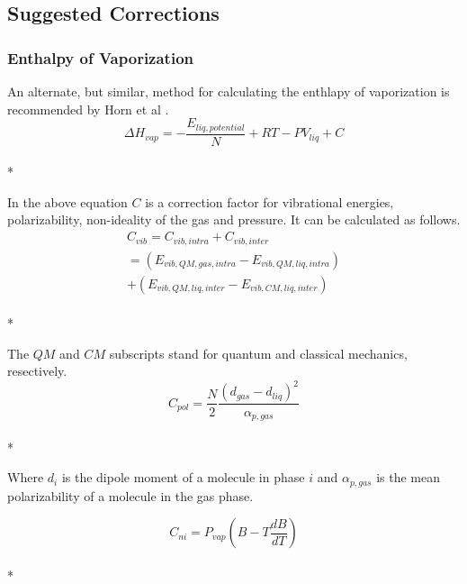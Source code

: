 \documentclass[aps,pre,twocolumn,nofootinbib,superscriptaddress,linenumbers,10pt, draft,tightenlines]{revtex4-1}
\begin{document}



\subsection{Suggested Corrections}
\subsubsection{Enthalpy of Vaporization}
An alternate, but similar, method for calculating the enthlapy of vaporization is recommended by Horn et al \cite{horn}.
\begin{equation}\Delta H_{vap} = -\frac{E_{liq, potential}}{N} + R T - P V_{liq} + C\end{equation}\\*

In the above equation $C$ is a correction factor for vibrational energies, polarizability, non-ideality of the gas and pressure. It can be calculated as follows.
\begin{multline}
C_{vib} = C_{vib,intra} + C_{vib,inter} \\ = \left(E_{vib,QM,gas,intra} - E_{vib,QM,liq,intra}\right) \\ + \left(E_{vib,QM,liq,inter} - E_{vib,CM,liq,inter}\right)
\end{multline}\\*

The $QM$ and $CM$ subscripts stand for quantum and classical mechanics, resectively. 
\begin{equation}C_{pol} = \frac{N}{2} \frac{\left(d_{gas} - d_{liq}\right)^2}{\alpha_{p,gas}}\end{equation}\\*

Where $d_i$ is the dipole moment of a molecule in phase $i$ and $\alpha_{p,gas}$ is the mean polarizability of a molecule in the gas phase.

\begin{equation}C_{ni} = P_{vap} \left(B - T \frac{dB}{dT}\right)\end{equation}\\*
\end{document}
